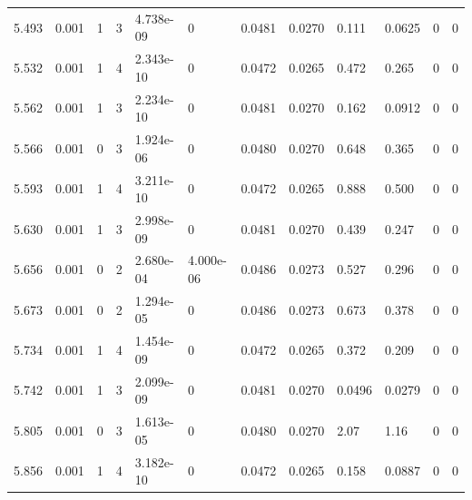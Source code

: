 \documentclass[preview]{standalone}
\begin{document}
{{{{\begin{tabular}{L{1.2cm}C{1.2cm} C{0.3cm}C{0.5cm} C{1.4cm}C{1.4cm} C{1.4cm}C{1.4cm} C{1.6cm}C{1.6cm} C{1.6cm}C{1.6cm}}
  5.493  &  0.001  & 1     &  3 &  4.738e-09  & 0  &  0.0481&   0.0270& 0.111 & 0.0625   &  0 & 0  \\ 
  5.532  &  0.001  & 1     &  4 &  2.343e-10  & 0  &  0.0472&   0.0265& 0.472 & 0.265   &  0 & 0  \\ 
  5.562  &  0.001  & 1     &  3 &  2.234e-10  & 0  &  0.0481&   0.0270& 0.162 & 0.0912   &  0 & 0  \\ 
  5.566  &  0.001  & 0     &  3 &  1.924e-06  & 0  &  0.0480&   0.0270& 0.648 & 0.365   &  0 & 0  \\ 
  5.593  &  0.001  & 1     &  4 &  3.211e-10  & 0  &  0.0472&   0.0265& 0.888 & 0.500   &  0 & 0  \\ 
  5.630  &  0.001  & 1     &  3 &  2.998e-09  & 0  &  0.0481&   0.0270& 0.439 & 0.247   &  0 & 0  \\ 
  5.656  &  0.001  & 0     &  2 &  2.680e-04  & 4.000e-06  &  0.0486&   0.0273& 0.527 & 0.296   &  0 & 0  \\ 
  5.673  &  0.001  & 0     &  2 &  1.294e-05  & 0  &  0.0486&   0.0273& 0.673 & 0.378   &  0 & 0  \\ 
  5.734  &  0.001  & 1     &  4 &  1.454e-09  & 0  &  0.0472&   0.0265& 0.372 & 0.209   &  0 & 0  \\ 
  5.742  &  0.001  & 1     &  3 &  2.099e-09  & 0  &  0.0481&   0.0270& 0.0496 & 0.0279   &  0 & 0  \\ 
  5.805  &  0.001  & 0     &  3 &  1.613e-05  & 0  &  0.0480&   0.0270& 2.07 & 1.16   &  0 & 0  \\ 
  5.856  &  0.001  & 1     &  4 &  3.182e-10  & 0  &  0.0472&   0.0265& 0.158 & 0.0887   &  0 & 0  \\ 
\hline 
\end{tabular} 

}}}}
\end{document}
